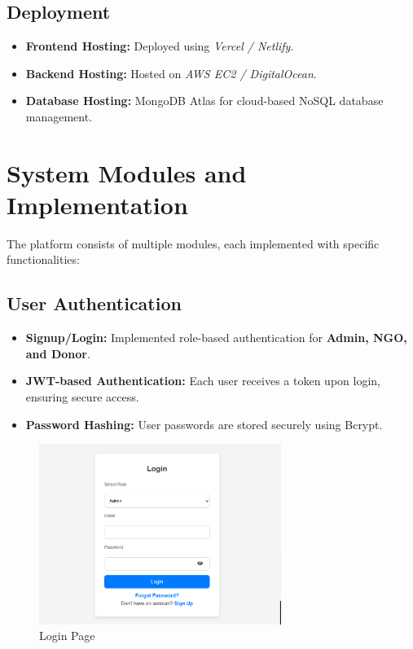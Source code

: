 \subsection{Deployment}
\begin{itemize}
    \item \textbf{Frontend Hosting:} Deployed using \textit{Vercel / Netlify}.
    \item \textbf{Backend Hosting:} Hosted on \textit{AWS EC2 / DigitalOcean}.
    \item \textbf{Database Hosting:} MongoDB Atlas for cloud-based NoSQL database management.
\end{itemize}

\section{System Modules and Implementation}
The platform consists of multiple modules, each implemented with specific functionalities:

\subsection{User Authentication}
\begin{itemize}
    \item \textbf{Signup/Login:} Implemented role-based authentication for \textbf{Admin, NGO, and Donor}.
    \item \textbf{JWT-based Authentication:} Each user receives a token upon login, ensuring secure access.
    \item \textbf{Password Hashing:} User passwords are stored securely using Bcrypt.
\end{itemize}
\begin{figure}[h]
    \centering
    \includegraphics[width=0.7\textwidth]{images/login.png}
    \caption{Login Page}
    \label{fig: Login page}
\end{figure}

